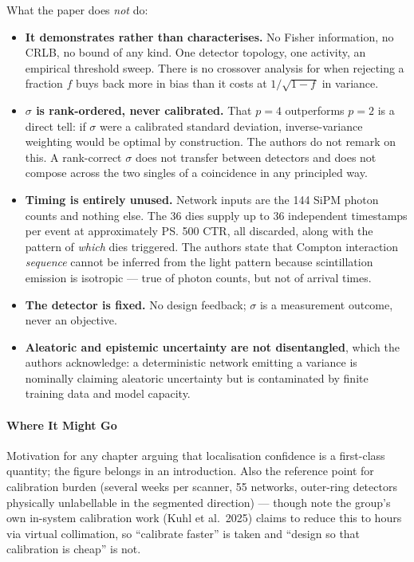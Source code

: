 What the paper does \emph{not} do:
\begin{itemize}
    \item \textbf{It demonstrates rather than characterises.} No Fisher information, no
        CRLB, no bound of any kind. One detector topology, one activity, an empirical
        threshold sweep. There is no crossover analysis for when rejecting a fraction $f$
        buys back more in bias than it costs at $1/\sqrt{1-f}$ in variance.
    \item \textbf{$\sigma$ is rank-ordered, never calibrated.} That $p = 4$ outperforms
        $p = 2$ is a direct tell: if $\sigma$ were a calibrated standard deviation,
        inverse-variance weighting would be optimal by construction. The authors do not
        remark on this. A rank-correct $\sigma$ does not transfer between detectors and
        does not compose across the two singles of a coincidence in any principled way.
    \item \textbf{Timing is entirely unused.} Network inputs are the 144 SiPM photon counts
        and nothing else. The 36 dies supply up to 36 independent timestamps per event at
        approximately \ps{500} CTR, all discarded, along with the pattern of \emph{which}
        dies triggered. The authors state that Compton interaction \emph{sequence} cannot
        be inferred from the light pattern because scintillation emission is isotropic ---
        true of photon counts, but not of arrival times.
    \item \textbf{The detector is fixed.} No design feedback; $\sigma$ is a measurement
        outcome, never an objective.
    \item \textbf{Aleatoric and epistemic uncertainty are not disentangled}, which the
        authors acknowledge: a deterministic network emitting a variance is nominally
        claiming aleatoric uncertainty but is contaminated by finite training data and
        model capacity.
\end{itemize}

\paragraph{Where It Might Go}
Motivation for any chapter arguing that localisation confidence is a first-class quantity;
the  figure belongs in an introduction. Also the reference point for calibration
burden (several weeks per scanner, 55 networks, outer-ring detectors physically
unlabellable in the segmented direction) --- though note the group's own in-system
calibration work (Kuhl et al.\ 2025) claims to reduce this to hours via virtual
collimation, so ``calibrate faster'' is taken and ``design so that calibration is cheap''
is not.

